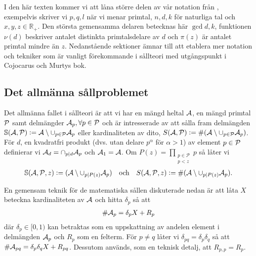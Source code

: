 
I den här texten kommer vi att låna större delen av vår notation från \cite{cojocarumurty}, exempelvis skriver vi \(p, q, l\) när vi menar primtal, \(n, d, k\) för naturliga tal och \(x, y, z \in \mathbb{R}_+\). Den största gemensamma delaren betecknas här \(\gcd{d, k}\), funktionen \(\nu(d)\) beskriver antalet distinkta primtalsdelare av \(d\) och \(\pi(z)\) är antalet primtal mindre än \(z\). Nedanstående sektioner ämnar till att etablera mer notation och tekniker som är vanligt förekommande i sållteori med utgångspunkt i Cojocarus och Murtys bok.


\subsection{Det allmänna sållproblemet}
Det allmänna fallet i sållteori är att vi har en mängd heltal \(\A\), en mängd primtal \(\P\) samt delmängder \(\A_p, \forall p \in \P\) och är intresserade av att sålla fram delmängden \(\mathbb{S}(\A, \P) := \A \setminus \cup_{p \in \P} \A_p\) eller kardinaliteten av dito, \(S(\A, \P) :=\card{(\A \setminus \cup_{p \in \P} \A_p)}\). För \(d\), en kvadratfri produkt (dvs. utan delare \(p^\alpha\) för \(\alpha > 1\)) av element \(p \in \P\) definierar vi \(\A_d = \cap_{p \divides d} \A_p\) och \(\A_1 = \A\). Om \(P(z) = \prod_{\substack{p\in \mathcal{P} \\ p < z}} p\) så låter vi
\begin{align*}
    \mathbb{S}(\A, \P, z) := (\A \setminus \cup_{p \divides P(z)} \A_p)
    \quad \text{och} \quad
    \S{A}{P}{z} := \card{(\A \setminus \cup_{p \divides P(z)} \A_p)} .
\end{align*}

En gemensam teknik för de matematiska sållen diskuterade nedan är att låta \(X\) beteckna kardinaliteten av \(\A\) och hitta \(\delta_p\) så att
\begin{align} 
    \card{\A_p} = \delta_p X + R_p\label{deltaX}
\end{align}
där \(\delta_p \in [0, 1)\) kan betraktas som en uppskattning av andelen element i delmängden \(\A_p\) och \(R_p\) som en felterm. För \(p \neq q\) låter vi \(\delta_{pq} = \delta_p \delta_q\) så att \(\card{\A_{pq}} = \delta_p \delta_q X + R_{pq}\). Dessutom används, som en teknisk detalj, att \(R_{p,p} = R_p\).


